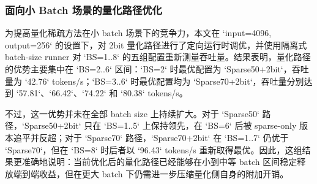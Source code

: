 \subsubsection{面向小 Batch 场景的量化路径优化}

为提高量化稀疏方法在小 batch 场景下的竞争力，本文在 `input=4096, output=256` 的设置下，对 2bit 量化路径进行了定向运行时调优，并使用隔离式 batch-size runner 对 `BS=1..8` 的五组配置重新测量吞吐量。结果表明，量化路径的优势主要集中在 `BS=2..6` 区间：`BS=2` 时最优配置为 `Sparse50+2bit`，吞吐量为 `42.76` tokens/s；`BS=3..6` 时最优配置均为 `Sparse70+2bit`，吞吐量分别达到 `57.81`、`66.42`、`74.22` 和 `80.38` tokens/s。

不过，这一优势并未在全部 batch size 上持续扩大。对于 `Sparse50` 路径，`Sparse50+2bit` 只在 `BS=1..5` 上保持领先，在 `BS=6` 后被 sparse-only 版本追平并反超；对于 `Sparse70` 路径，`Sparse70+2bit` 在 `BS=1..7` 仍优于 `Sparse70`，但在 `BS=8` 时后者以 `96.43` tokens/s 重新取得最优。因此，这组结果更准确地说明：当前优化后的量化路径已经能够在小到中等 batch 区间稳定释放端到端收益，但在更大 batch 下仍需进一步压缩量化侧自身的附加开销。
